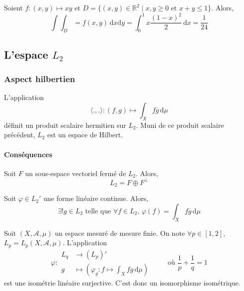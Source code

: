 
  \begin{example}
    Soient $f : (x,y) \mapsto xy$ et $D = \{ (x,y) \in \mathbb{R}^2 \mid x, y \geq 0 \text{ et } x + y \leq 1 \}$. Alors,
    \[ \int \int_D = f(x,y) \, \mathrm{d}x \mathrm{d}y = \int_0^1 x \frac{(1-x)^2}{2} \, \mathrm{d}x = \frac{1}{24} \]
  \end{example}

  \subsection{L'espace \texorpdfstring{$L_2$}{L₂}}

  \subsubsection{Aspect hilbertien}


  \begin{definition}
    L'application
    \[ \langle ., . \rangle : (f,g) \mapsto \int_X f \overline{g} \, \mathrm{d}\mu \]
    définit un produit scalaire hermitien sur $L_2$. Muni de ce produit scalaire précédent, $L_2$ est un espace de Hilbert.
  \end{definition}

  \paragraph{Conséquences}

  \begin{theorem}
    Soit $F$ un sous-espace vectoriel fermé de $L_2$. Alors,
    \[ L_2 = F \oplus F^\perp \]
  \end{theorem}

  \begin{corollary}
    Soit $\varphi \in L_2'$ une forme linéaire continue. Alors,
    \[ \exists! g \in L_2 \text{ telle que } \forall f \in L_2, \, \varphi(f) = \int_X f \overline{g} \, \mathrm{d}\mu \]
  \end{corollary}


  \begin{application}[Dual de $L_p$]
    Soit $(X, \mathcal{A}, \mu)$ un espace mesuré de mesure finie. On note $\forall p \in [1, 2]$, $L_p = L_p(X, \mathcal{A}, \mu)$. L'application
    \[
    \varphi :
    \begin{array}{ll}
      L_q &\rightarrow (L_p)' \\
      g &\mapsto \left( \varphi_g : f \mapsto \int_X f g \, \mathrm{d}\mu \right)
    \end{array}
    \qquad \text{ où } \frac{1}{p} + \frac{1}{q} = 1
    \]
    est une isométrie linéaire surjective. C'est donc un isomorphisme isométrique.
  \end{application}

